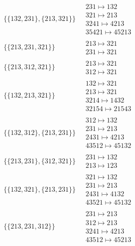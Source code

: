 \begin{scriptsize}
\begin{align}
\begin{matrix}
\end{matrix}
\\
\{\{132, 231\}, \{213, 321\}\}
\ 
&
\begin{matrix}
231 \mapsto 132\\321 \mapsto 213\\3241 \mapsto 4213\\35421 \mapsto 45213
\end{matrix}
\\
\{\{213, 231, 321\}\}
\ 
&
\begin{matrix}
213 \mapsto 321\\231 \mapsto 321
\end{matrix}
\\
\{\{213, 312, 321\}\}
\ 
&
\begin{matrix}
213 \mapsto 321\\312 \mapsto 321
\end{matrix}
\\
\{\{132, 213, 321\}\}
\ 
&
\begin{matrix}
132 \mapsto 321\\213 \mapsto 321\\3214 \mapsto 1432\\32154 \mapsto 21543
\end{matrix}
\\
\{\{132, 312\}, \{213, 231\}\}
\ 
&
\begin{matrix}
312 \mapsto 132\\231 \mapsto 213\\2431 \mapsto 4213\\43512 \mapsto 45132
\end{matrix}
\\
\{\{213, 231\}, \{312, 321\}\}
\ 
&
\begin{matrix}
231 \mapsto 132\\213 \mapsto 123
\end{matrix}
\\
\{\{132, 321\}, \{213, 231\}\}
\ 
&
\begin{matrix}
321 \mapsto 132\\231 \mapsto 213\\2431 \mapsto 4132\\43521 \mapsto 45132
\end{matrix}
\\
\{\{213, 231, 312\}\}
\ 
&
\begin{matrix}
231 \mapsto 213\\312 \mapsto 213\\3241 \mapsto 4213\\43512 \mapsto 45213

\end{matrix}
\end{align}
\end{scriptsize}
